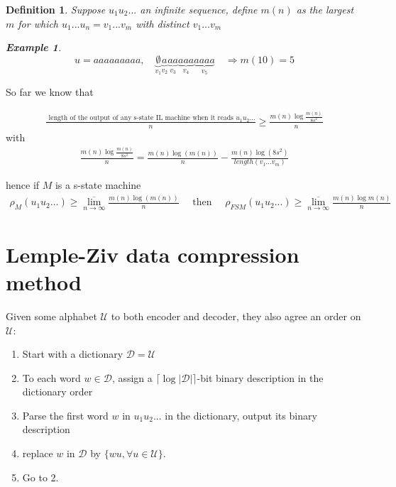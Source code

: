 \documentclass[twoside]{article}
\newtheorem{definition}{Definition}[section]
\theoremstyle{definition} %
\newtheorem{example}{Example}
\def\D{\mathcal{D}}
\def\U{\mathcal{U}}
\begin{document}
\begin{definition}
  Suppose $u_1 u_2 ...$ an infinite sequence, define $m(n)$ as the largest $m$ for which $u_1 ... u_n = v_1 ... v_m$ with distinct $v_1 ... v_m$
  \begin{example}
    $$ u = aaaaaaaaa, \quad \underbrace{\emptyset}_{v_1} \underbrace{a}_{v_2} \underbrace{aa}_{v_3} \underbrace{aaa}_{v_4} \underbrace{aaaa}_{v_5} \quad \Rightarrow m(10) = 5 $$
  \end{example}
\end{definition}

So far we know that

\begin{align*}
  \frac{\text{ length of the output of any s-state IL machine when it reads } u_1 u_2 ... }{n} \geq \frac{m(n) \log \frac{m(n)}{8 s^2}}{n}
\end{align*}
with
\begin{align*}
  \frac{m(n) \log \frac{m(n)}{8 s^2}}{n} = \frac{m(n) \log(m(n))}{n} - \frac{m(n) \log(8 s^2)}{length(v_1 ... v_m)}
\end{align*}

hence if $M$ is a s-state machine
\begin{align*}
  \rho_M (u_1 u_2 ...) \geq \overline{\lim_{n \to \infty}} \frac{m(n) \log(m(n))}{n}
  \quad \text{ then } \quad
  \rho_{FSM} (u_1 u_2 ...) \geq \overline{\lim_{n \to \infty}} \frac{m(n) \log m(n)}{n}
\end{align*}




\cleardoublepage
\section{Lemple-Ziv data compression method}

Given some alphabet $\U$ to both encoder and decoder, they also agree an order on $\U$:

\begin{enumerate}
  \item Start with a dictionary $\D = \U$
  \item To each word $w \in \D$, assign a $\lceil \log |\D| \rceil $-bit binary description in the dictionary order
  \item Parse the first word $w$ in $u_1 u_2 ...$ in the dictionary, output its binary description
  \item replace $w$ in $\D$ by $\{ wu, \forall u \in \U \}$.
  \item Go to 2.
\end{enumerate}
\end{document}
